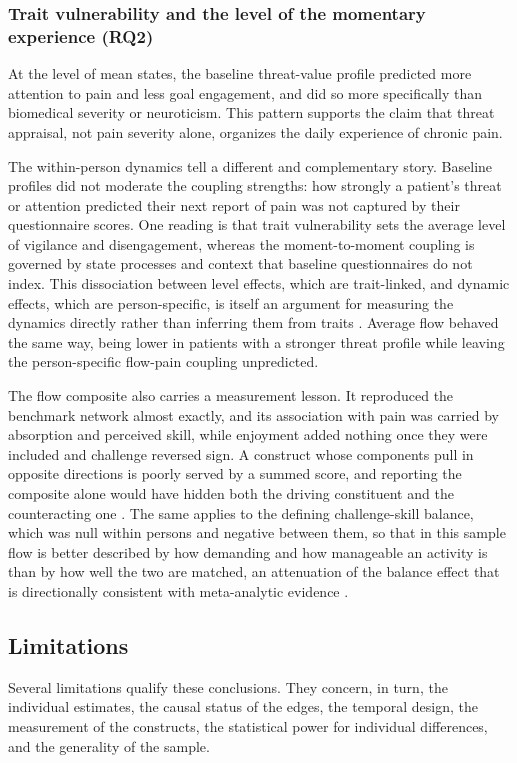 \documentclass[11pt,a4paper]{article}
\begin{document}
\subsubsection{Trait vulnerability and the level of the momentary experience (RQ2)}
At the level of mean states, the baseline threat-value profile predicted more attention to pain
and less goal engagement, and did so more specifically than biomedical severity or neuroticism.
This pattern supports the claim that threat appraisal, not pain severity alone, organizes the
daily experience of chronic pain.

The within-person dynamics tell a different and complementary story. Baseline profiles did not
moderate the coupling strengths: how strongly a patient's threat or attention predicted their next
report of pain was not captured by their questionnaire scores. One reading is that trait
vulnerability sets the average level of vigilance and disengagement, whereas the moment-to-moment
coupling is governed by state processes and context that baseline questionnaires do not index.
This dissociation between level effects, which are trait-linked, and dynamic effects, which are
person-specific, is itself an argument for measuring the dynamics directly rather than inferring
them from traits \citep{wright2020personalized}. Average flow behaved the same way, being lower in
patients with a stronger threat profile while leaving the person-specific flow-pain coupling
unpredicted.

The flow composite also carries a measurement lesson. It reproduced the benchmark network almost
exactly, and its association with pain was carried by absorption and perceived skill, while
enjoyment added nothing once they were included and challenge reversed sign. A construct whose
components pull in opposite directions is poorly served by a summed score, and reporting the
composite alone would have hidden both the driving constituent and the counteracting one
\citep{vanderweele2022constructed}. The same applies to the defining challenge-skill balance, which
was null within persons and negative between them, so that in this sample flow is better described
by how demanding and how manageable an activity is than by how well the two are matched, an
attenuation of the balance effect that is directionally consistent with meta-analytic evidence
\citep{fong2015challenge}.

\subsection{Limitations}
Several limitations qualify these conclusions. They concern, in turn, the individual estimates,
the causal status of the edges, the temporal design, the measurement of the constructs, the
statistical power for individual differences, and the generality of the sample.
\end{document}
